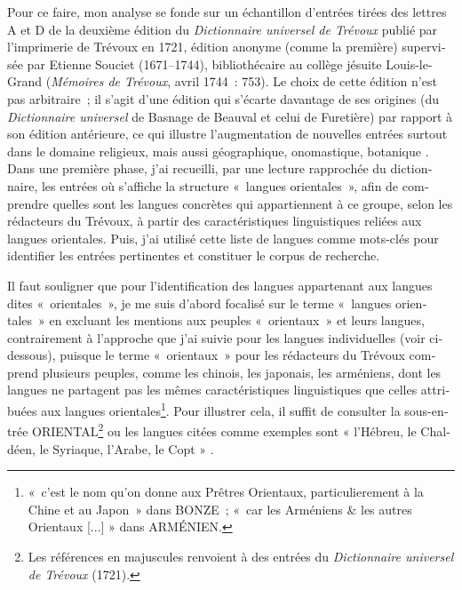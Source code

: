 \documentclass[output=paper,colorlinks,citecolor=brown,arabicfont,chinesefont,booklanguage=french]{langscibook}
\begin{document}
\begin{otherlanguage}{french}
Pour ce faire, mon analyse se fonde sur un échantillon d’entrées tirées des lettres A et D de la deuxième édition du \emph{Dictionnaire universel de Trévoux} publié par l’imprimerie de Trévoux en 1721, édition anonyme (comme la première) supervisée par Etienne Souciet (1671--1744), bibliothécaire au collège jésuite Louis-le-Grand (\emph{Mémoires de Trévoux}, avril 1744~: 753). Le choix de cette édition n'est pas arbitraire~; il s’agit d’une édition qui s’écarte davantage de ses origines (du \emph{Dictionnaire universel} de Basnage de Beauval et celui de Furetière) par rapport à son édition antérieure, ce qui illustre l’augmentation de nouvelles entrées surtout dans le domaine religieux, mais aussi géographique, onomastique, botanique \citep[137]{Leca-tsiomis2023}. Dans une première phase, j’ai recueilli, par une lecture rapprochée du dictionnaire, les entrées où s’affiche la structure «~langues orientales~», afin de comprendre quelles sont les langues concrètes qui appartiennent à ce groupe, selon les rédacteurs du Trévoux, à partir des caractéristiques linguistiques reliées aux langues orientales. Puis, j’ai utilisé cette liste de langues comme mots-clés pour identifier les entrées pertinentes et constituer le corpus de recherche.

Il faut souligner que pour l’identification des langues appartenant aux langues dites «~orientales~», je me suis d’abord focalisé sur le terme «~langues orientales~» en excluant les mentions aux peuples «~orientaux~» et leurs langues, contrairement à l'approche que j’ai suivie pour les langues individuelles (voir ci-dessous), puisque le terme «~orientaux~» pour les rédacteurs du Trévoux comprend plusieurs peuples, comme les chinois, les japonais, les arméniens, dont les langues ne partagent pas les mêmes caractéristiques linguistiques que celles attribuées aux langues orientales\footnote{«~c’est le nom qu’on donne aux Prêtres Orientaux, particulierement à la Chine et au Japon~» dans BONZE~; «~car les Arméniens \& les autres Orientaux [...] »  dans ARMÉNIEN.}. Pour illustrer cela, il suffit de consulter la sous-entrée ORIENTAL\footnote{Les références en majuscules renvoient à des entrées du \emph{Dictionnaire universel de Trévoux} (1721).} ou les langues citées comme exemples sont « l’Hébreu, le Chaldéen, le Syriaque, l’Arabe, le Copt » .


\end{otherlanguage}
\end{document}
